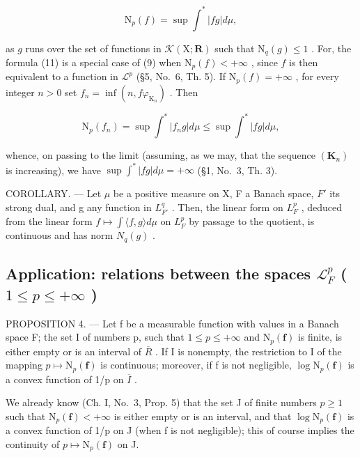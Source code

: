 \[
\mathrm{N} _ {p} (f) = \sup \int^ {*} | f g | d \mu ,\tag{11}
\]

as \(g\) runs over the set of functions in \(\mathcal{K}(\mathrm{X};\mathbf{R})\) such that \(\mathrm{N}_q(g)\leqslant 1\) . For, the formula (11) is a special case of (9) when \(\mathrm{N}_p(f) < +\infty\) , since \(f\) is then equivalent to a function in \(\mathcal{L}^p\) (§5, No.~6, Th. 5). If \(\mathrm{N}_p(f) = +\infty\) , for every integer \(n > 0\) set \(f_{n} = \inf (n,f\varphi_{\mathrm{K}_{n}})\) . Then

\[
\mathrm{N} _ {p} (f _ {n}) = \sup \int^ {*} | f _ {n} g | d \mu \leqslant \sup \int^ {*} | f g | d \mu ,
\]

whence, on passing to the limit (assuming, as we may, that the sequence \((\mathbf{K}_n)\) is increasing), we have \(\sup \int^{*}|fg| d\mu = +\infty\) (§1, No.~3, Th. 3).

COROLLARY. --- Let \(\mu\) be a positive measure on X, F a Banach space, \(F'\) its strong dual, and g any function in \(L_{F'}^{q}\) . Then, the linear form on \(L_{F}^{p}\) , deduced from the linear form \(f \mapsto \int \langle f, g \rangle d\mu\) on \(L_{F}^{p}\) by passage to the quotient, is continuous and has norm \(N_{q}(g)\) .

\subsection{\texorpdfstring{Application: relations between the spaces \(\mathcal{L}_{F}^{p}\) ( \(1 \leqslant p \leqslant +\infty\) )}{Application: relations between the spaces L sub F to the p ( 1 <= p <= +infinity )}}

PROPOSITION 4. --- Let f be a measurable function with values in a Banach space F; the set I of numbers p, such that \(1 \leqslant p \leqslant +\infty\) and \(\mathrm{N}_{p}(\mathbf{f})\) is finite, is either empty or is an interval of \(\overline{R}\) . If I is nonempty, the restriction to I of the mapping \(p \mapsto \mathrm{N}_{p}(\mathbf{f})\) is continuous; moreover, if f is not negligible, \(\log \mathrm{N}_{p}(\mathbf{f})\) is a convex function of 1/p on \(\overline{I}\) .

We already know (Ch. I, No.~3, Prop. 5) that the set J of finite numbers \(p \geqslant 1\) such that \(\mathrm{N}_{p}(\mathbf{f}) < +\infty\) is either empty or is an interval, and that \(\log \mathrm{N}_{p}(\mathbf{f})\) is a convex function of 1/p on J (when f is not negligible); this of course implies the continuity of \(p \mapsto \mathrm{N}_{p}(\mathbf{f})\) on J.

